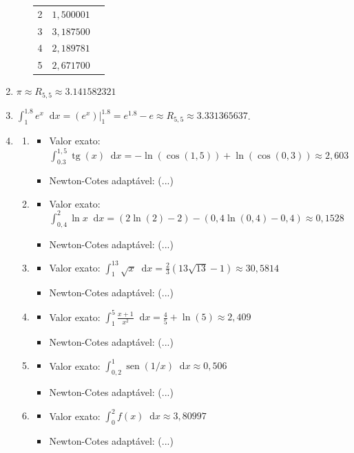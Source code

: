 \documentclass[12pt,a4paper]{article}
\newcommand{\fixme}{{\color{red}(...)}}
\newcommand*\sen{\operatorname{sen}}
\newcommand*\tg{\operatorname{tg}}
\newcommand*\diff{\mathop{}\!\mathrm{d}}
\begin{document}
\begin{enumerate}
\begin{enumerate}
\begin{center}
\begin{tabular}{crr}
2      & $1,500001$ \\
3      & $3,187500$ \\
4      & $2,189781$ \\
5      & $2,671700$ \\
\hline
\end{tabular}
\end{center}
\end{enumerate}
\item $\pi \approx R_{5,5} \approx 3.141582321$
\item $\int_1^{1.8} e^x\diff{x}
= \left(e^x \right)\Big|_{1}^{1.8}
= e^{1.8} - e
\approx R_{5,5}
\approx 3.331365637$.
\item \begin{enumerate}
\item \begin{itemize}
   \item Valor exato: $\int_{0.3}^{1,5} \tg(x)\diff{x} = -\ln(\cos(1,5))+\ln(\cos(0,3)) \approx 2,603$
   \item Newton-Cotes adaptável: \fixme
\end{itemize}
\item \begin{itemize}
   \item Valor exato: $\int_{0,4}^{2} \ln{x}\diff{x} = (2 \ln(2) - 2)-(0,4 \ln(0,4) - 0,4) \approx 0,1528$
   \item Newton-Cotes adaptável: \fixme
\end{itemize}
\item \begin{itemize}
   \item Valor exato: $\int_{1}^{13} \sqrt{x}\diff{x} = \frac{2}{3}(13 \sqrt{13} - 1) \approx 30,5814$
   \item Newton-Cotes adaptável: \fixme
\end{itemize}
\item \begin{itemize}
   \item Valor exato: $\int_1^5 \frac{x+1}{x^2}\diff{x} = \frac{4}{5} + \ln(5) \approx 2,409$
   \item Newton-Cotes adaptável: \fixme
\end{itemize}
\item \begin{itemize}
   \item Valor exato: $\int_{0,2}^{1} \sen(1/x)\diff{x} \approx 0,506$
   \item Newton-Cotes adaptável: \fixme
\end{itemize}
\item \begin{itemize}
   \item Valor exato: $\int_{0}^{2} f(x)\diff{x} \approx 3,80997$
   \item Newton-Cotes adaptável: \fixme
\end{itemize}
\end{enumerate}
\end{enumerate}
\end{document}
